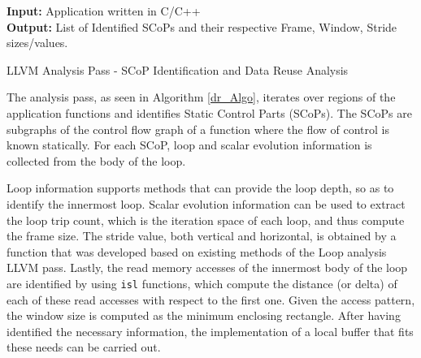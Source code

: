 \documentclass[]{usiinfthesis}
\begin{document}
\begin{algorithm}[t]
\begin{flushleft}
\textbf{Input:}  Application written in C/C++\\
\textbf{Output:} List of Identified SCoPs and their respective Frame, Window, Stride sizes/values.\\
\end{flushleft}
\begin{algorithmic}[1]
  \State{}
  \State{}
  \State{}
\EndFunction
\State
{}
  \State{}
  \State{}
    \State{}
    \State{}
    \State{}
    \State{}
    \State{}
  \EndIf
\EndFunction
\end{algorithmic}
\caption{LLVM Analysis Pass - SCoP Identification and 
Data Reuse Analysis}
\label{dr_Algo}
\end{algorithm}


The analysis pass, as seen in Algorithm  \ref{dr_Algo}, 
iterates over regions of the application 
functions and identifies Static Control Parts (SCoPs). The SCoPs are subgraphs of the control 
flow graph of a function 
where the flow of control is known statically. For each SCoP, loop and scalar evolution information
is collected from the body of the loop. \par

Loop information supports methods that can provide the 
loop depth, so as to identify the innermost loop. Scalar evolution information can be used to extract 
the loop trip count, which is the iteration space of each loop, and thus compute the frame size.
The stride value, both vertical and horizontal, is obtained by a function that was developed based
on existing methods of the Loop analysis LLVM pass.
Lastly, the read memory accesses of the innermost body of
the loop are identified by using \texttt{isl} functions, which
compute the
distance (or delta) of each of these read accesses with respect to the
first one. Given the access pattern, the window size is computed as the minimum 
enclosing rectangle. After having identified the necessary information, the implementation of a
local buffer that fits these needs can be carried out.\par
\end{document}
